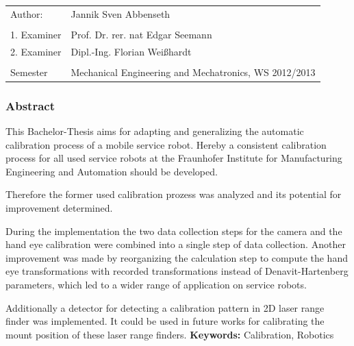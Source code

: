 \begin{tabular}{ll}

  Author:&Jannik Sven Abbenseth\\\\
  1. Examiner&Prof. Dr. rer. nat Edgar Seemann\\
  2. Examiner&Dipl.-Ing. Florian Weißhardt \\\\
  Semester& Mechanical Engineering and Mechatronics, WS 2012/2013
\end{tabular}
\subsubsection{Abstract}
\label{ssub:abstract}

This Bachelor-Thesis aims for adapting and generalizing the automatic 
calibration process of a mobile service robot.
Hereby a consistent calibration process for all used service robots at the
Fraunhofer Institute for Manufacturing Engineering and Automation should be
developed.

Therefore the former used calibration prozess was analyzed and its potential for
improvement determined.

During the implementation the two data collection steps for the camera and the
hand eye calibration were combined into a single step of data collection.
Another improvement was made by reorganizing the calculation step to compute 
the hand eye transformations with recorded transformations instead of Denavit-Hartenberg
parameters, which led to a wider range of application on service robots.

Additionally a detector for detecting a calibration pattern in 2D laser range finder
was implemented. It could be used in future works for calibrating the mount position
of these laser range finders.
\vfill
\textbf{Keywords: }Calibration, Robotics



\tableofcontents

\listoffigures



%
%
